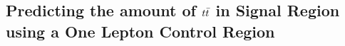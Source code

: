 
\subsection{Predicting the amount of $t\bar{t}$ in Signal Region using a One Lepton Control Region}
\label{sec:Bkg:ttbar:CR}

